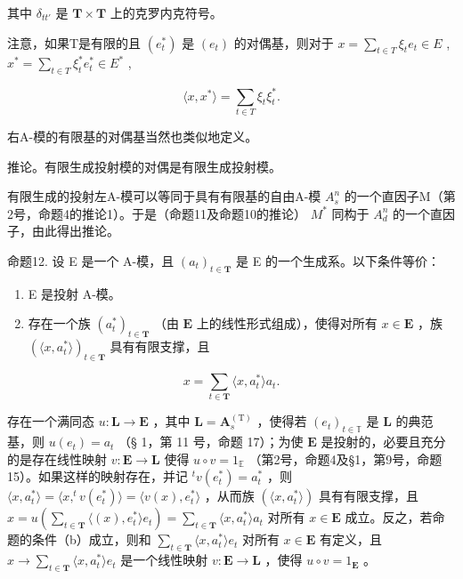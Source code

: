 其中 \(\delta_{tt'}\) 是 \(\mathbf{T} \times \mathbf{T}\) 上的克罗内克符号。

注意，如果T是有限的且 \((e_{t}^{*})\) 是 \((e_{t})\) 的对偶基，则对于 \(x = \sum_{t \in T} \xi_{t} e_{t} \in E\) , \(x^{*} = \sum_{t \in T} \xi_{t}^{*} e_{t}^{*} \in E^{*}\) ,

\[
\langle x, x ^ {*} \rangle = \sum_ {t \in T} \xi_ {t} \xi_ {t} ^ {*}.\tag{25}
\]

右A-模的有限基的对偶基当然也类似地定义。

推论。有限生成投射模的对偶是有限生成投射模。

有限生成的投射左A-模可以等同于具有有限基的自由A-模 \(A_{s}^{n}\) 的一个直因子M（第2号，命题4的推论1）。于是（命题11及命题10的推论） \(M^{*}\) 同构于 \(A_{d}^{n}\) 的一个直因子，由此得出推论。

命题12. 设 E 是一个 A-模，且 \((a_{t})_{t\in \mathbf{T}}\) 是 E 的一个生成系。以下条件等价：

\begin{enumerate}
\def\labelenumi{(\alph{enumi})}
\item
  E 是投射 A-模。
\item
  存在一个族 \((a_{t}^{*})_{t\in \mathbf{T}}\) （由 \(\mathbf{E}\) 上的线性形式组成），使得对所有 \(x\in \mathbf{E}\) ，族 \((\langle x,a_t^*\rangle)_{t\in \mathbf{T}}\) 具有有限支撑，且
\end{enumerate}

\[
x = \sum_ {t \in \mathbf {T}} \langle x, a _ {t} ^ {*} \rangle a _ {t}.\tag{26}
\]

存在一个满同态 \(u: \mathbf{L} \to \mathbf{E}\) ，其中 \(\mathbf{L} = \mathbf{A}_s^{(\mathrm{T})}\) ，使得若 \((e_t)_{t \in \mathbb{T}}\) 是 \(\mathbf{L}\) 的典范基，则 \(u(e_t) = a_t\) （§ 1，第 11 号，命题 17）；为使 \(\mathbf{E}\) 是投射的，必要且充分的是存在线性映射 \(v: \mathbf{E} \to \mathbf{L}\) 使得 \(u \circ v = 1_{\mathbb{E}}\) （第2号，命题4及§1，第9号，命题15）。如果这样的映射存在，并记 \(^tv(e_t^*) = a_t^*\) ，则 \(\langle x, a_t^* \rangle = \langle x, ^tv(e_t^*) \rangle = \langle v(x), e_t^* \rangle\) ，从而族 \((\langle x, a_t^* \rangle)\) 具有有限支撑，且 \(x = u\left(\sum_{t \in \mathbf{T}} \langle (x), e_t^* \rangle e_t\right) = \sum_{t \in \mathbf{T}} \langle x, a_t^* \rangle a_t\) 对所有 \(x \in \mathbf{E}\) 成立。反之，若命题的条件（b）成立，则和 \(\sum_{t \in \mathbf{T}} \langle x, a_t^* \rangle e_t\) 对所有 \(x \in \mathbf{E}\) 有定义，且 \(x \to \sum_{t \in \mathbf{T}} \langle x, a_t^* \rangle e_t\) 是一个线性映射 \(v: \mathbf{E} \to \mathbf{L}\) ，使得 \(u \circ v = 1_{\mathbf{E}}\) 。

